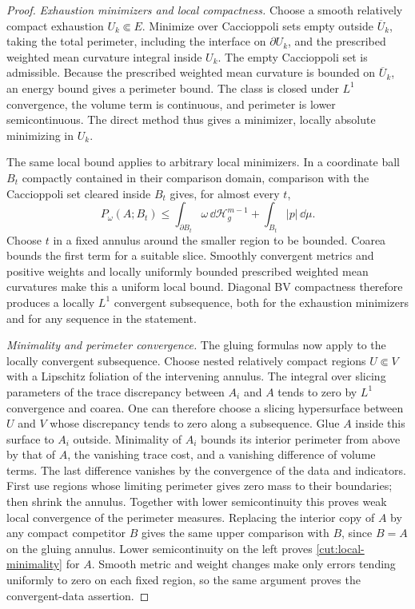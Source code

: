 \begin{proof}
\emph{Exhaustion minimizers and local compactness.}
Choose a smooth relatively compact exhaustion $U_k\Subset E$.
Minimize over Caccioppoli sets empty outside $\overline U_k$, taking the total
perimeter, including the interface on $\partial U_k$, and the prescribed weighted mean curvature
integral inside $U_k$.  The empty Caccioppoli set is admissible.  Because the
prescribed weighted mean curvature is bounded on $\overline U_k$, an energy bound gives a perimeter
bound.  The class is closed under $L^1$ convergence, the volume term is
continuous, and perimeter is lower semicontinuous.  The direct method
thus gives a minimizer, locally absolute minimizing in $U_k$.

The same local bound applies to arbitrary local minimizers.
In a coordinate ball $B_t$ compactly contained in their comparison
domain, comparison with the Caccioppoli set cleared inside $B_t$ gives, for almost
every $t$,
\[
 P_\omega(A;B_t)\le\int_{\partial B_t}\omega\,\dd\mathcal H_g^{m-1}
                         +\int_{B_t}|p|\,\dd\mu.
\]
Choose $t$ in a fixed annulus around the smaller region to be bounded.
Coarea bounds the first term for a suitable slice.  Smoothly convergent
metrics and positive weights and locally uniformly bounded prescribed weighted mean curvatures
make this a uniform local bound.  Diagonal BV compactness therefore
produces a locally $L^1$ convergent subsequence, both for the exhaustion
minimizers and for any sequence in the statement.

\emph{Minimality and perimeter convergence.}
The gluing formulas now apply to the locally convergent subsequence.
Choose nested relatively compact regions $U\Subset V$
with a Lipschitz foliation of the intervening annulus.  The integral over
slicing parameters of the trace discrepancy between $A_i$ and $A$ tends
to zero by $L^1$ convergence and coarea.  One can therefore choose a
slicing hypersurface between $U$ and $V$ whose discrepancy tends to zero
along a subsequence.  Glue $A$ inside this surface to $A_i$ outside.
Minimality of $A_i$ bounds its interior perimeter from above by that of
$A$, the vanishing trace cost, and a vanishing difference of volume
terms.  The last difference vanishes by the convergence of the data and
indicators.  First use regions whose limiting perimeter gives zero mass
to their boundaries; then shrink the annulus.  Together with lower
semicontinuity this proves weak local convergence of the perimeter
measures.  Replacing the interior copy of $A$ by any compact competitor
$B$ gives the same upper comparison with $B$, since $B=A$ on the gluing
annulus.  Lower semicontinuity on the left proves
\eqref{cut:local-minimality} for $A$.  Smooth metric and weight changes
make only errors tending uniformly to zero on each fixed region, so the
same argument proves the convergent-data assertion.


\end{proof}
